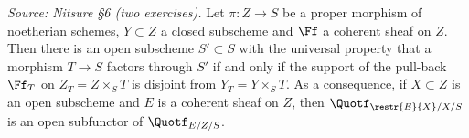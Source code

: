 \begin{lemma}
  \label{lem:quot-open-subfunctor}
  \textit{Source: Nitsure §6 (two exercises).}
  Let $\pi\colon Z\to S$ be a proper morphism of noetherian schemes, $Y\subset Z$
  a closed subscheme and $\Ff$ a coherent sheaf on $Z$. Then there is an open
  subscheme $S'\subset S$ with the universal property that a morphism $T\to S$
  factors through $S'$ if and only if the support of the pull-back $\Ff_T$ on
  $Z_T = Z\times_S T$ is disjoint from $Y_T = Y\times_S T$. As a consequence, if
  $X\subset Z$ is an open subscheme and $E$ is a coherent sheaf on $Z$, then
  $\Quotf_{\restr{E}{X}/X/S}$ is an open subfunctor of $\Quotf_{E/Z/S}$.
\end{lemma}

